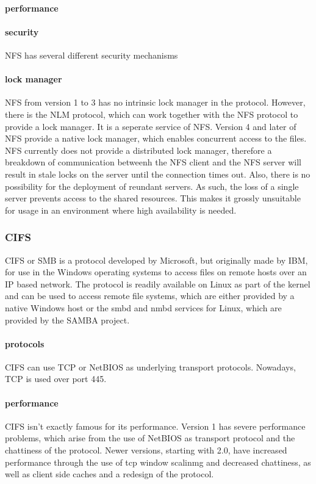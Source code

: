 \paragraph{performance}
\paragraph{security}
\ac{NFS} has several different security mechanisms
\paragraph{lock manager}
\ac{NFS} from version 1 to 3 has no intrinsic lock manager in the protocol. However, there is the \ac{NLM}
protocol, which can work together with the \ac{NFS} protocol to provide a lock manager.
It is a seperate service of \ac{NFS}.
Version 4 and later of \ac{NFS} provide a native lock manager, which enables concurrent access to the files.
\linebreak[3]
\ac{NFS} currently does not provide a distributed lock manager, therefore a breakdown
of communication betweenh the \ac{NFS} client and the \ac{NFS} server will result in stale locks
on the server until the connection times out. Also, there is no possibility
for the deployment of reundant servers. As such, the loss of a single server prevents
access to the shared resources. This makes it grossly unsuitable for usage in an environment
where high availability is needed.

\subsubsection{\ac{CIFS}}
\ac{CIFS} or \ac{SMB} is a protocol developed by Microsoft, but originally made
by IBM, for use in the Windows operating systems to access files on remote hosts
over an IP based network. The protocol is readily available on Linux as part
of the kernel and can be used to access remote file systems, which are
either provided by a native Windows host or the smbd and nmbd services for Linux,
which are provided by the SAMBA project.
\paragraph{protocols}
\ac{CIFS} can use TCP or NetBIOS as underlying transport protocols. Nowadays, TCP is
used over port 445.
\paragraph{performance}
\ac{CIFS} isn't exactly famous for its performance. Version 1 has severe performance
problems, which arise from the use of NetBIOS as transport protocol and the
chattiness of the protocol. Newer versions, starting with 2.0, have increased
performance through the use of tcp window scalinmg and decreased chattiness, as well
as client side caches and a redesign of the protocol.
